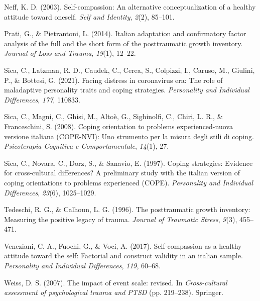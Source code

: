 \documentclass[
]{apa7}
\newlength{\cslhangindent}
\newlength{\cslentryspacingunit} %
\newenvironment{CSLReferences}[2] %
 {%
  \setlength{\parindent}{0pt}
  \ifodd #1
  \let\oldpar\par
  \def\par{\hangindent=\cslhangindent\oldpar}
  \fi
  \setlength{\parskip}{#2\cslentryspacingunit}
 }%
 {}
\begin{document}
\begin{CSLReferences}{1}{0}
\leavevmode{}%
Neff, K. D. (2003). Self-compassion: An alternative conceptualization of
a healthy attitude toward oneself. \emph{Self and Identity},
\emph{2}(2), 85--101.

\leavevmode{}%
Prati, G., \& Pietrantoni, L. (2014). Italian adaptation and
confirmatory factor analysis of the full and the short form of the
posttraumatic growth inventory. \emph{Journal of Loss and Trauma},
\emph{19}(1), 12--22.

\leavevmode{}%
Sica, C., Latzman, R. D., Caudek, C., Cerea, S., Colpizzi, I., Caruso,
M., Giulini, P., \& Bottesi, G. (2021). Facing distress in coronavirus
era: The role of maladaptive personality traits and coping strategies.
\emph{Personality and Individual Differences}, \emph{177}, 110833.

\leavevmode{}%
Sica, C., Magni, C., Ghisi, M., Altoè, G., Sighinolfi, C., Chiri, L. R.,
\& Franceschini, S. (2008). Coping orientation to problems
experienced-nuova versione italiana (COPE-NVI): Uno strumento per la
misura degli stili di coping. \emph{Psicoterapia Cognitiva e
Comportamentale}, \emph{14}(1), 27.

\leavevmode{}%
Sica, C., Novara, C., Dorz, S., \& Sanavio, E. (1997). Coping
strategies: Evidence for cross-cultural differences? A preliminary study
with the italian version of coping orientations to problems experienced
(COPE). \emph{Personality and Individual Differences}, \emph{23}(6),
1025--1029.

\leavevmode{}%
Tedeschi, R. G., \& Calhoun, L. G. (1996). The posttraumatic growth
inventory: Measuring the positive legacy of trauma. \emph{Journal of
Traumatic Stress}, \emph{9}(3), 455--471.

\leavevmode{}%
Veneziani, C. A., Fuochi, G., \& Voci, A. (2017). Self-compassion as a
healthy attitude toward the self: Factorial and construct validity in an
italian sample. \emph{Personality and Individual Differences},
\emph{119}, 60--68.

\leavevmode{}%
Weiss, D. S. (2007). The impact of event scale: revised. In
\emph{Cross-cultural assessment of psychological trauma and PTSD} (pp.
219--238). Springer.

\end{CSLReferences}
\end{document}
